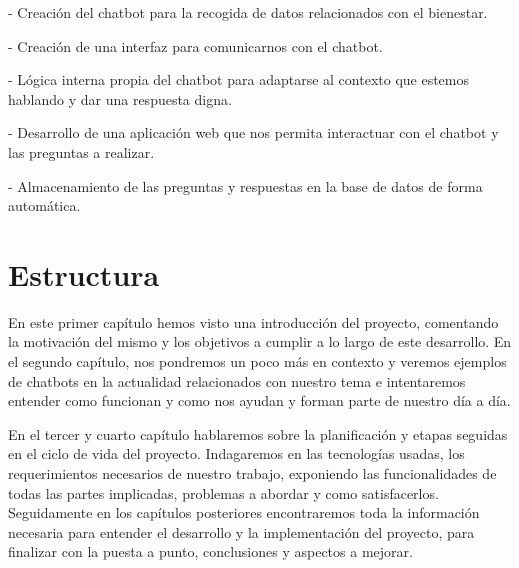 - Creación del chatbot para la recogida de datos relacionados con el bienestar.\vspace{0.1cm}

- Creación de una interfaz para comunicarnos con el chatbot. \vspace{0.1cm}

- Lógica interna propia del chatbot para adaptarse al contexto que estemos hablando y dar una respuesta digna. \vspace{0.1cm}

- Desarrollo de una aplicación web que nos permita interactuar con el chatbot y las preguntas a realizar.\vspace{0.1cm}

- Almacenamiento de las preguntas y respuestas en la base de datos de forma automática.
\vspace{0.3cm}

\section{Estructura}

En este primer capítulo hemos visto una introducción del proyecto, comentando la motivación del mismo y los objetivos a cumplir a lo largo de este desarrollo. En el segundo capítulo, nos pondremos un poco más en contexto y veremos ejemplos de chatbots en la actualidad relacionados con nuestro tema e intentaremos entender como funcionan y como nos ayudan y forman parte de nuestro día a día.

En el tercer y cuarto capítulo hablaremos sobre la planificación y etapas seguidas en el ciclo de vida del proyecto. Indagaremos en las tecnologías usadas, los requerimientos necesarios de nuestro trabajo, exponiendo las funcionalidades de todas las partes implicadas, problemas a abordar y como satisfacerlos. Seguidamente en los capítulos posteriores encontraremos toda la información necesaria para entender el desarrollo y la implementación del proyecto, para finalizar con la puesta a punto, conclusiones y aspectos a mejorar. 